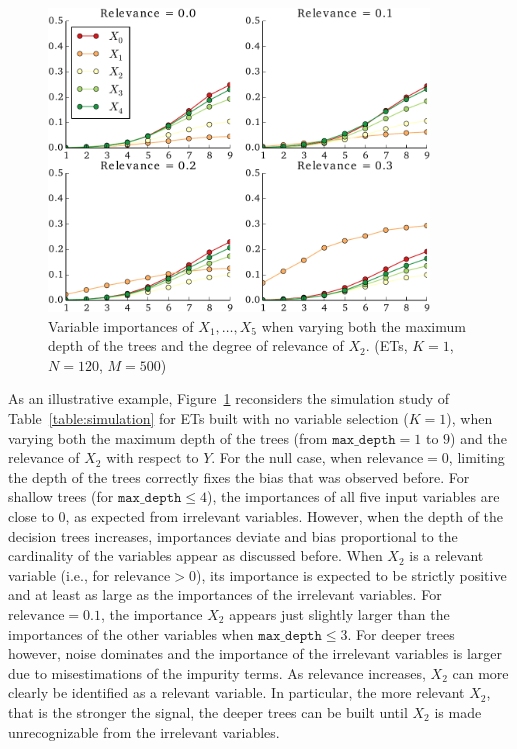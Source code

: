 \begin{figure}
\centering
\includegraphics[width=0.9\textwidth]{figures/ch7_bias_depth.pdf}
\caption{Variable importances of $X_1, \dots, X_5$ when varying both the
    maximum depth of the trees and the degree of relevance of $X_2$. (ETs, $K=1$, $N=120$, $M=500$)}
\label{fig:7:bias:depth}
\end{figure}

As an illustrative example, Figure~\ref{fig:7:bias:depth} reconsiders the
simulation study of Table~\ref{table:simulation} for ETs  built with no
variable selection ($K=1$), when varying both the maximum depth of the trees
(from $\texttt{max\_depth}=1$ to $9$) and the relevance of $X_2$ with respect
to $Y$. For the null case, when $\text{relevance}=0$, limiting the depth of the
trees correctly fixes the bias that was observed before. For shallow trees (for
$\texttt{max\_depth} \leq 4$), the importances of all five input variables are
close to 0, as expected from irrelevant variables. However, when the depth of
the decision trees increases, importances deviate and bias proportional to the
cardinality of the variables appear as discussed before. When $X_2$ is a
relevant variable (i.e., for $\text{relevance}>0$), its importance is expected
to be strictly positive and at least as large as the importances of the
irrelevant variables. For $\text{relevance}=0.1$, the importance $X_2$ appears
just slightly larger than the importances of the other variables when
$\texttt{max\_depth} \leq 3$. For deeper trees  however, noise dominates and
the importance of the irrelevant variables is larger due to misestimations of
the impurity terms. As  relevance increases, $X_2$ can more clearly be
identified as a relevant variable. In particular, the more relevant $X_2$, that
is the stronger the signal, the deeper trees can be built until $X_2$ is made
unrecognizable from the irrelevant variables.

